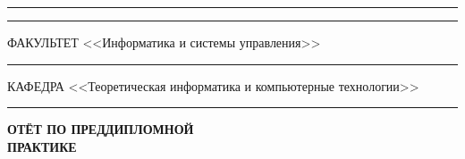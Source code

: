 \documentclass[14pt, russian]{scrartcl}
\begin{document}
\begin{titlepage}
\vspace{-2pt}
\hspace{-34.5pt}\rule{\textwidth}{2.5pt}

\vspace*{-20.3pt}
\hspace{-34.5pt}\rule{\textwidth}{0.4pt}
\vspace{0.5ex}
\noindent \small ФАКУЛЬТЕТ\hspace{80pt} <<Информатика и системы управления>>

\vspace*{-16pt}
\hspace{35pt}\rule{0.855\textwidth}{0.4pt}

\vspace{0.5ex}
\noindent \small КАФЕДРА\hspace{50pt} <<Теоретическая информатика и компьютерные технологии>>

\vspace*{-16pt}
\hspace{25pt}\rule{0.875\textwidth}{0.4pt}
 
 
\vspace{3em}
 
\begin{center}
\Large \bf{ОТЁТ ПО ПРЕДДИПЛОМНОЙ \\ ПРАКТИКЕ\\}
\end{center}








 



\end{titlepage}
\end{document}
